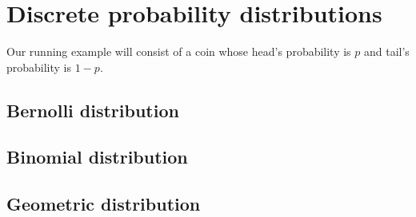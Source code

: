 \chapter{Discrete probability distributions}
Our running example will consist of a coin whose head's probability is $p$ and tail's probability is $1-p$.
\section{Bernolli distribution}
\section{Binomial distribution}
\section{Geometric distribution}
